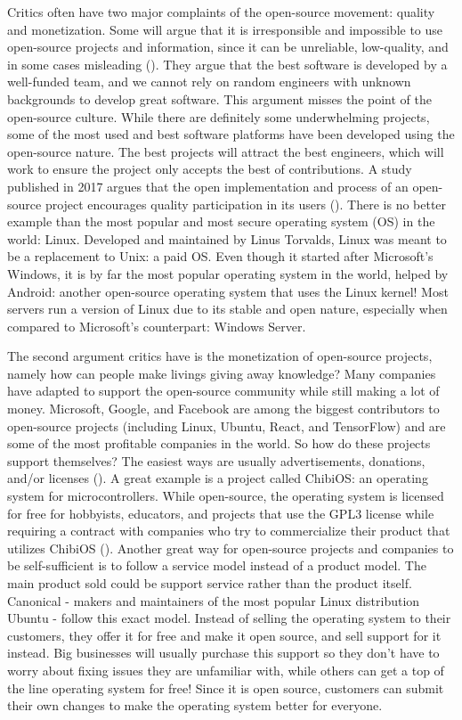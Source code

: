 Critics often have two major complaints of the open-source movement: quality and monetization. Some will argue that it is irresponsible and impossible to use open-source projects and information, since it can be unreliable, low-quality, and in some cases misleading (\cite{OpenSourceFail}). They argue that the best software is developed by a well-funded team, and we cannot rely on random engineers with unknown backgrounds to develop great software. This argument misses the point of the open-source culture. While there are definitely some underwhelming projects, some of the most used and best software platforms have been developed using the open-source nature. The best projects will attract the best engineers, which will work to ensure the project only accepts the best of contributions. A study published in 2017 argues that the open implementation and process of an open-source project encourages quality participation in its users (\cite{OpenSource_Good}). There is no better example than the most popular and most secure operating system (OS) in the world: Linux. Developed and maintained by Linus Torvalds, Linux was meant to be a replacement to Unix: a paid OS. Even though it started after Microsoft's Windows, it is by far the most popular operating system in the world, helped by Android: another open-source operating system that uses the Linux kernel! Most servers run a version of Linux due to its stable and open nature, especially when compared to Microsoft's counterpart: Windows Server.

The second argument critics have is the monetization of open-source projects, namely how can people make livings giving away knowledge? Many companies have adapted to support the open-source community while still making a lot of money. Microsoft, Google, and Facebook are among the biggest contributors to open-source projects (including Linux, Ubuntu, React, and TensorFlow) and are some of the most profitable companies in the world. So how do these projects support themselves? The easiest ways are usually advertisements, donations, and/or licenses (\cite{OpenSouceMakeMoney}). A great example is a project called ChibiOS: an operating system for microcontrollers. While open-source, the operating system is licensed for free for hobbyists, educators, and projects that use the GPL3 license while requiring a contract with companies who try to commercialize their product that utilizes ChibiOS (\cite{ChibiOS}). Another great way for open-source projects and companies to be self-sufficient is to follow a service model instead of a product model. The main product sold could be support service rather than the product itself. Canonical - makers and maintainers of the most popular Linux distribution Ubuntu - follow this exact model. Instead of selling the operating system to their customers, they offer it for free and make it open source, and sell support for it instead. Big businesses will usually purchase this support so they don't have to worry about fixing issues they are unfamiliar with, while others can get a top of the line operating system for free! Since it is open source, customers can submit their own changes to make the operating system better for everyone. 

